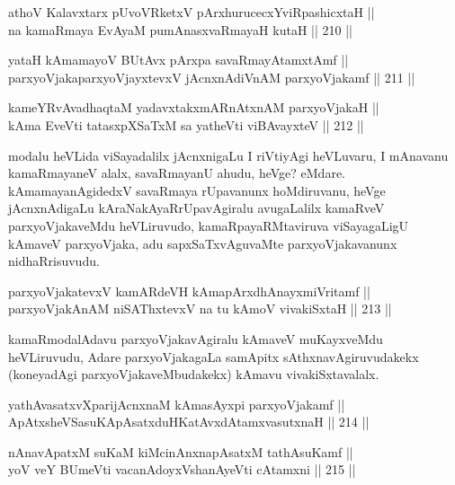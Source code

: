 
\begin{shl}
athoV Kalavxtarx pUvoVRketxV pArxhurucecxYviRpashicxtaH || \\
na kamaRmaya EvAyaM pumAnasxvaRmayaH kutaH \hfill || 210 ||  
\end{shl}

\begin{shl}
yataH kAmamayoV BUtAvx pArxpa savaRmayAtamxtAmf || \\
parxyoVjakaparxyoVjayxtevxV jAcnxnAdiVnAM parxyoVjakamf \hfill || 211 ||  
\end{shl}

\begin{shl}
kameYRvAvadhaqtaM yadavxtakxmARnAtxnAM parxyoVjakaH || \\
kAma EveVti tatasxpXSaTxM sa yatheVti viBAvayxteV \hfill || 212 ||  
\end{shl}

\begin{artha}
modalu heVLida viSayadalilx jAcnxnigaLu I riVtiyAgi heVLuvaru, I
mAnavanu kamaRmayaneV alalx, savaRmayanU ahudu, heVge?
eMdare. kAmamayanAgidedxV savaRmaya rUpavanunx hoMdiruvanu, heVge
jAcnxnAdigaLu kAraNakAyaRrUpavAgiralu avugaLalilx kamaRveV
parxyoVjakaveMdu heVLiruvudo, kamaRpayaRMtaviruva viSayagaLigU
kAmaveV parxyoVjaka, adu sapxSaTxvAguvaMte parxyoVjakavanunx
nidhaRrisuvudu.
\end{artha}

\begin{shl}
parxyoVjakatevxV kamARdeVH kAmapArxdhAnayxmiVritamf || \\
parxyoVjakAnAM niSAThxtevxV na tu kAmoV vivakiSxtaH \hfill || 213 ||  
\end{shl}

\begin{artha}
kamaRmodalAdavu parxyoVjakavAgiralu kAmaveV muKayxveMdu heVLiruvudu,
Adare parxyoVjakagaLa samApitx sAthxnavAgiruvudakekx (koneyadAgi
parxyoVjakaveMbudakekx) kAmavu vivakiSxtavalalx.
\end{artha}

\begin{shl}
yathAvasatxvXparijAcnxnaM kAmasAyxpi parxyoVjakamf ||  \\
ApAtxsheVSasuKApAsatxduHKatAvxdAtamxvasutxnaH \hfill || 214 ||  
\end{shl}

\begin{shl}
nAnavApatxM suKaM kiMcinAnxnapAsatxM tathA\s suKamf || \\
yoV veY BUmeVti vacanAdoyxV\s shanAyeVti cA\s \s tamxni \hfill || 215 ||  
\end{shl}

